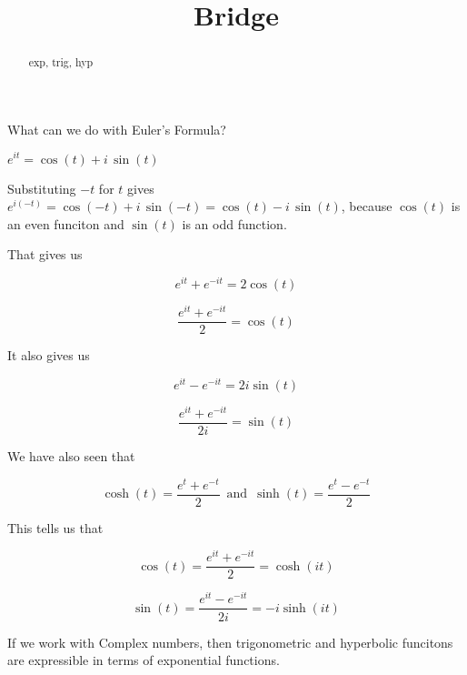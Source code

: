 \documentclass{ximera}
\title{Bridge}
\begin{document}
\begin{abstract}
exp, trig, hyp
\end{abstract}
\maketitle





What can we do with Euler's Formula?



$e^{i t} = \cos(t) + i \, \sin(t)$

Substituting $-t$ for $t$ gives $e^{i (-t)} = \cos(-t) + i \, \sin(-t) = \cos(t) - i \, \sin(t)$, because $\cos(t)$ is an even funciton and $\sin(t)$ is an odd function.



That gives us 

\[   e^{i t}  + e^{-i t} = 2 \cos(t)    \]


\[   \frac{e^{i t}  + e^{-i t}}{2} = \cos(t)    \]


It also gives us 



\[   e^{i t}  - e^{-i t} = 2 i \sin(t)    \]


\[   \frac{e^{i t}  + e^{-i t}}{2 i} = \sin(t)    \]





We have also seen that 


\[  \cosh(t)  = \frac{e^t + e^{-t}}{2}      \,   \text{ and } \,  \sinh(t)  = \frac{e^t - e^{-t}}{2}     \]



This tells us that 

\[  \cos(t) =  \frac{e^{i t} + e^{-i t}}{2} = \cosh(i t)      \]




\[  \sin(t) =  \frac{e^{i t} - e^{-i t}}{2 i} = -i \sinh(i t)      \]






If we work with Complex numbers, then trigonometric and hyperbolic funcitons are expressible in terms of exponential functions.
\end{document}
